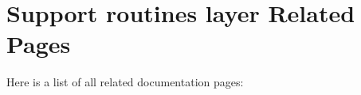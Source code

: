 \section{Support routines layer Related Pages}
Here is a list of all related documentation pages:\begin{CompactList}
\item {}

\end{CompactList}
